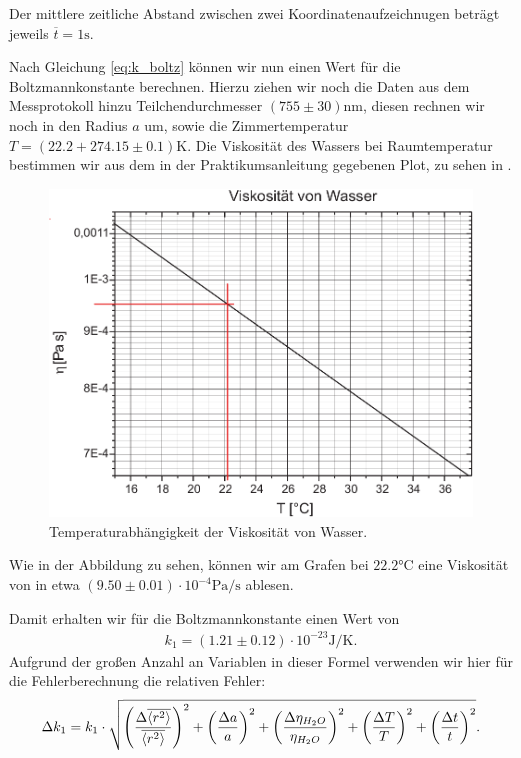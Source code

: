 Der mittlere zeitliche Abstand zwischen zwei Koordinatenaufzeichnugen beträgt jeweils $\overline{t} = 1\si{\second}$.

Nach Gleichung \eqref{eq:k_boltz} können wir nun einen Wert für die Boltzmannkonstante berechnen. Hierzu ziehen wir noch die Daten aus dem Messprotokoll hinzu Teilchendurchmesser $(755 \pm 30)\si{\nano\meter}$, diesen rechnen wir noch in den Radius $a$ um, sowie die Zimmertemperatur $T = (22.2 + 274.15 \pm 0.1)  \si{\kelvin}$. Die Viskosität des Wassers bei Raumtemperatur bestimmen wir aus dem in der Praktikumsanleitung gegebenen Plot, zu sehen in .

\begin{figure}[H]
  \centering
  \includegraphics[width=.80\textwidth]{files/viskositaet_ablesen.png}
  \caption{Temperaturabhängigkeit der Viskosität von Wasser.}
  \label{fig:viskositaet_ablesen.png}
\end{figure}
Wie in der Abbildung zu sehen, können wir am Grafen bei $22.2\si{\celsius}$ eine Viskosität von in etwa $(9.50 \pm 0.01) \cdot 10^{-4} \si{\pascal\per\second}$ ablesen.


Damit erhalten wir für die Boltzmannkonstante einen Wert von
\begin{align}
  k_{1} = (1.21 \pm  0.12) \cdot 10^{-23} \si{\joule\per\kelvin}.
\end{align}
Aufgrund der großen Anzahl an Variablen in dieser Formel verwenden wir hier für die Fehlerberechnung die relativen Fehler:
\begin{align}
  \Delta k_{1} = k_{1} \cdot \sqrt{\qty(\frac{\Delta \overline{\expval{r^2}}}{\overline{\expval{r^2}}})^{2} + \qty(\frac{\Delta a}{a})^{2} + \qty(\frac{\Delta \eta_{H_2 O}}{\eta_{H_2 O}})^{2} + \qty(\frac{\Delta T}{T})^{2} + \qty(\frac{\Delta t}{t})^{2}}.
\end{align}

